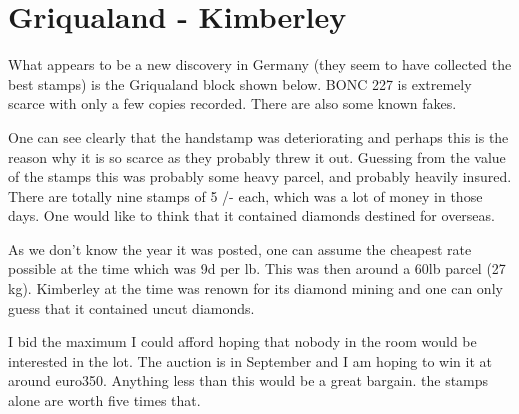 \section{Griqualand - Kimberley}

What appears to be a new discovery in Germany (they seem to have collected 
the best stamps) is the Griqualand block shown below. 
BONC 227 is extremely scarce with only a few copies recorded. 
There are also some known fakes.







One can see clearly that the handstamp was deteriorating and 
perhaps this is the reason why it is so scarce as they 
probably threw it out. Guessing from the value of the stamps 
this was probably some heavy parcel, and probably heavily insured. 
There are totally nine stamps of 5 /- each, which was a lot 
of money in those days. One would like to think that it 
contained diamonds destined for overseas. 

As we don't know the year it was posted, one can assume 
the cheapest rate possible at the time which was 9d per lb. 
This was then around a 60lb parcel (27 kg). Kimberley at 
the time was renown for its diamond mining and one can 
only guess that it contained uncut diamonds.

I bid the maximum I could afford hoping that nobody in
the room would be interested in the lot. The auction 
is in September and I am hoping to win it at around euro350. 
Anything less than this would be a great bargain. the stamps 
alone are worth five times that. 

	 
                                                  